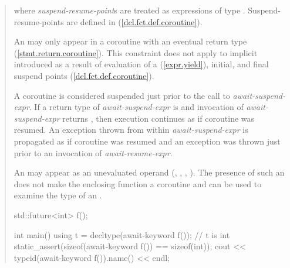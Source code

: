 \begin{quote}
%
%
%
%

where \textit{suspend-resume-point}s are treated as  expressions of type . Suspend-resume-points are defined in (\ref{dcl.fct.def.coroutine}).

\pnum
An  may only appear in a coroutine 
with an eventual return type (\ref{stmt.return.coroutine}). This constraint does not apply to implicit  introduced as a result of evaluation of a  (\ref{expr.yield}), initial, and final suspend points (\ref{dcl.fct.def.coroutine}).

\pnum
A coroutine is considered suspended just prior to the call to \textit{await-suspend-expr}. If a return type of \textit{await-suspend-expr} is  and invocation of \textit{await-suspend-expr} returns , then execution continues as if coroutine was resumed. An exception thrown from within \textit{await-suspend-expr} is propagated as if coroutine was resumed and an exception was thrown just prior to an invocation of \textit{await-resume-expr}.

\pnum
\enternote
An  may appear as an unevaluated operand (, , , ). The presence of such an  does not make the enclosing function a coroutine and can be used to examine the type of an .

\enterexample
\begin{codeblock}	
  std::future<int> f();
  
  int main() {
    using t = decltype(await-keyword f()); // t is int
    static_assert(sizeof(await-keyword f()) == sizeof(int));
    cout << typeid(await-keyword f()).name() << endl;
  }
\end{codeblock}
\exitexample%
\exitnote

\end{quote}
